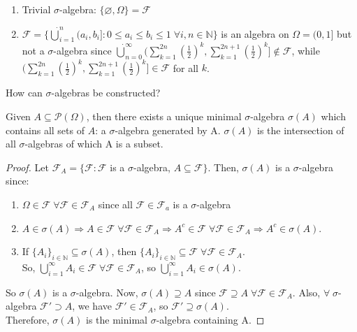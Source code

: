 \documentclass{article}
\begin{document}
	\begin{myex}{}{}
		\begin{enumerate}
			\item Trivial $\sigma$-algebra: $\{\varnothing, \Omega\}=\mathcal{F}$
			\item $\mathcal{F}=\{\dot\bigcup_{i=1}^n(a_i, b_i] : 0\leq a_i\leq b_i\leq 1\;\forall i, n\in\mathbb{N}\}$ is an algebra on $\Omega=(0, 1]$ but not a $\sigma$-algebra since $\dot\bigcup_{n=0}^{\infty}(\sum_{k=1}^{2n}(\frac{1}{2})^k, \sum_{k=1}^{2n+1}(\frac{1}{2})^k]\notin\mathcal{F}$, while $(\sum_{k=1}^{2n}(\frac{1}{2})^k, \sum_{k=1}^{2n+1}(\frac{1}{2})^k]\in\mathcal{F}$ for all $k$.
		\end{enumerate}
	\end{myex}
	
	How can $\sigma$-algebras be constructed?
	
	\begin{myprop}{}{}
		Given $A\subseteq\mathcal{P}(\Omega)$, then there exists a unique minimal $\sigma$-algebra $\sigma(A)$ which contains all sets of $A$: a $\sigma$-algebra generated by A. $\sigma(A)$ is the intersection of all $\sigma$-algebras of which A is a subset.
		
		\begin{proof}
		Let $\mathcal{F}_A=\{\mathcal{F} : \mathcal{F}$ is a $\sigma$-algebra, $A\subseteq\mathcal{F}\}$. Then, $\sigma(A)$ is a $\sigma$-algebra since:
		\begin{enumerate}[label=(\roman*)]
			\item $\Omega\in\mathcal{F}\;\forall\mathcal{F}\in\mathcal{F}_A$ since all $\mathcal{F}\in\mathcal{F}_a$ is a $\sigma$-algebra
			\item $A\in\sigma(A)\Rightarrow A\in\mathcal{F}\;\forall\mathcal{F}\in\mathcal{F}_A\Rightarrow A^c\in\mathcal{F}\;\forall\mathcal{F}\in\mathcal{F}_A\Rightarrow A^c\in\sigma(A)$.
			\item If $\{A_i\}_{i\in\mathbb{N}}\subseteq \sigma(A)$, then $\{A_i\}_{i\in\mathbb{N}}\subseteq\mathcal{F}\;\forall\mathcal{F}\in\mathcal{F}_A$.\\ So, $\bigcup_{i=1}^{\infty}A_i\in\mathcal{F}\;\forall\mathcal{F}\in\mathcal{F}_A$, so $\bigcup_{i=1}^{\infty}A_i\in\sigma(A)$.
		\end{enumerate}
		
		So $\sigma(A)$ is a $\sigma$-algebra. Now, $\sigma(A)\supseteq A$ since $\mathcal{F}\supseteq A\;\forall\mathcal{F}\in\mathcal{F}_A$. Also, $\forall\;\sigma$-algebra $\mathcal{F}'\supset A$, we have $\mathcal{F}'\in\mathcal{F}_A$, so $\mathcal{F}'\supseteq\sigma(A)$.\\
		
		Therefore, $\sigma(A)$ is the minimal $\sigma$-algebra containing A.
	\end{proof}
	\end{myprop}
	
\end{document}

